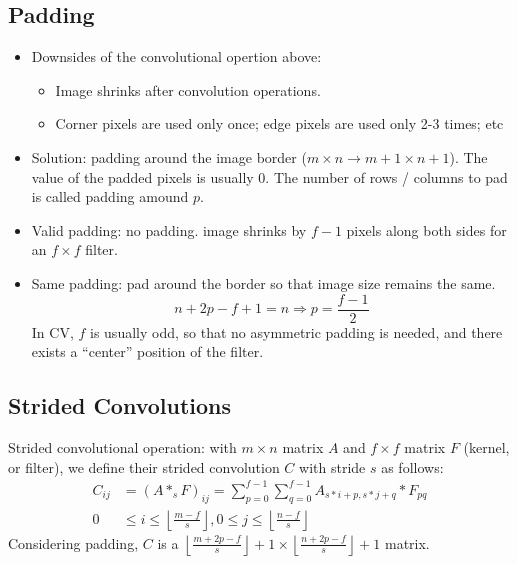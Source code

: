 \subsection{Padding}
\begin{itemize}
  \item Downsides of the convolutional opertion above:
  \begin{itemize}
    \item Image shrinks after convolution operations.
    \item Corner pixels are used only once; edge pixels are used only 2-3 times; etc
  \end{itemize} 
  \item Solution: padding around the image border ($m\times n\rightarrow m+1\times n+1$). The value of the padded pixels is usually 0. The number of rows / columns to pad is called padding amound $p$.
  \item Valid padding: no padding. image shrinks by $f-1$ pixels along both sides for an $f\times f$ filter. 
  \item Same padding: pad around the border so that image size remains the same.
  \[n+2p-f+1=n\Rightarrow p=\frac{f-1}{2}\]
  In CV, $f$ is usually odd, so that no asymmetric padding is needed, and there exists a ``center'' position of the filter.
\end{itemize}
\subsection{Strided Convolutions}
Strided convolutional operation: with $m\times n$ matrix $A$ and $f\times f$ matrix $F$ (kernel, or filter), we define their strided convolution $C$ with stride $s$ as follows:
\begin{align*}
  C_{ij}&=\left(A*_sF\right)_{ij}=\displaystyle\sum_{p=0}^{f-1}\displaystyle\sum_{q=0}^{f-1}A_{s*i+p,s*j+q}*F_{pq}\\
  0&\le i\le \left\lfloor\frac{m-f}{s}\right\rfloor, 0\le j\le \left\lfloor\frac{n-f}{s}\right\rfloor
\end{align*}
Considering padding, $C$ is a $\left\lfloor\frac{m+2p-f}{s}\right\rfloor+1\times\left\lfloor\frac{n+2p-f}{s}\right\rfloor+1$ matrix.
